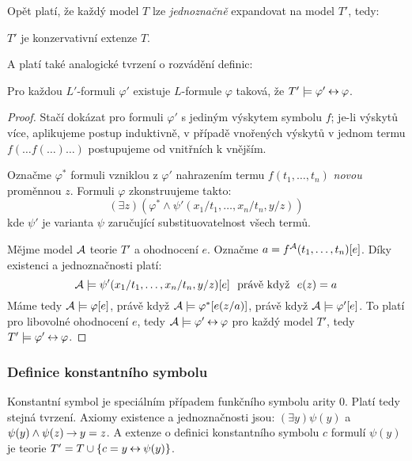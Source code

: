 Opět platí, že každý model $T$ lze \emph{jednoznačně} expandovat na model $T'$, tedy:
\begin{corollary}
    $T'$ je konzervativní extenze $T$.
\end{corollary}

A platí také analogické tvrzení o rozvádění definic:

\begin{proposition}
    Pro každou $L'$-formuli $\varphi'$ existuje $L$-formule $\varphi$ taková, že $T'\models\varphi'\mathbin{\leftrightarrow}\varphi$.
\end{proposition}
\begin{proof}
    Stačí dokázat pro formuli $\varphi'$ s jediným výskytem symbolu $f$; je-li výskytů více, aplikujeme postup induktivně, v případě vnořených výskytů v jednom termu $f(\dots f(\dots)\dots)$ postupujeme od vnitřních k vnějším.

    Označme $\varphi^*$ formuli vzniklou z $\varphi'$ nahrazením termu $f(t_1,\dots,t_n)$ \emph{novou} proměnnou $z$. Formuli $\varphi$ zkonstruujeme takto:
    $$
    (\exists z)(\varphi^*\land \psi'(x_1/t_1,\dots,x_n/t_n,y/z))
    $$
    kde $\psi'$ je varianta $\psi$ zaručující substituovatelnost všech termů.

    Mějme model $\mathcal{A}$ teorie $T'$ a ohodnocení $e$. Označme $a=f^{\mathcal{A}}(t_1,\dots,t_n)[e]$. Díky existenci a jednoznačnosti platí:
    $$
    \A\models\psi'(x_1/t_1,\dots,x_n/t_n,y/z)[e]\ \text{ právě když }\ e(z)=a 
    $$
    Máme tedy $\mathcal{A}\models\varphi[e]$, právě když $\mathcal{A}\models\varphi^*[e(z/a)]$, právě když $\mathcal{A}\models\varphi'[e]$. To platí pro libovolné ohodnocení $e$, tedy $\mathcal{A}\models\varphi'\mathbin{\leftrightarrow}\varphi$ pro každý model $T'$, tedy $T'\models\varphi'\mathbin{\leftrightarrow}\varphi$.
\end{proof}

\subsubsection*{Definice konstantního symbolu}

Konstantní symbol je speciálním případem funkčního symbolu arity $0$. Platí tedy stejná tvrzení. Axiomy existence a jednoznačnosti jsou: $(\exists y)\psi(y)$ a $\psi(y)\land\psi(z)\mathbin{\rightarrow} y=z$. A extenze o definici konstantního symbolu $c$ formulí $\psi(y)$ je teorie $T'=T\cup\{c=y\mathbin{\leftrightarrow} \psi(y)\}$.

